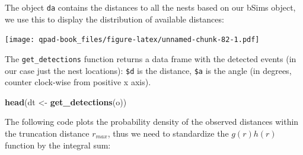 \documentclass[12pt,]{book}
\newenvironment{Shaded}{\begin{snugshade}}{\end{snugshade}}
\newcommand{\DataTypeTok}[1]{\textcolor[rgb]{0.13,0.29,0.53}{#1}}
\newcommand{\DecValTok}[1]{\textcolor[rgb]{0.00,0.00,0.81}{#1}}
\newcommand{\KeywordTok}[1]{\textcolor[rgb]{0.13,0.29,0.53}{\textbf{#1}}}
\newcommand{\NormalTok}[1]{#1}
\newcommand{\OperatorTok}[1]{\textcolor[rgb]{0.81,0.36,0.00}{\textbf{#1}}}
\newcommand{\OtherTok}[1]{\textcolor[rgb]{0.56,0.35,0.01}{#1}}
\newcommand{\StringTok}[1]{\textcolor[rgb]{0.31,0.60,0.02}{#1}}
\begin{document}
The object \texttt{da} contains the distances to all the nests
based on our bSims object,
we use this to display the distribution of available distances:

\begin{Shaded}
\end{Shaded}

\texttt{[image: qpad-book\_files/figure-latex/unnamed-chunk-82-1.pdf]}

The \texttt{get\_detections} function returns a data frame with the
detected events (in our case just the nest locations):
\texttt{\$d} is the distance, \texttt{\$a} is the angle
(in degrees, counter clock-wise from positive x axis).

\begin{Shaded}
\begin{Highlighting}[]
\KeywordTok{head}\NormalTok{(dt <-}\StringTok{ }\KeywordTok{get_detections}\NormalTok{(o))}
\end{Highlighting}
\end{Shaded}

The following code plots the probability density of the
observed distances within the truncation distance \(r_{max}\),
thus we need to standardize the \(g(r) h(r)\) function
by the integral sum:
\end{document}
